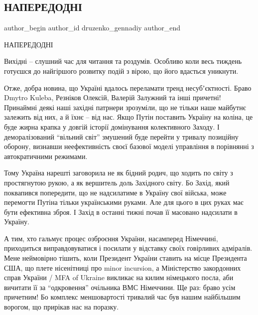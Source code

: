  
 
 
 
 
 
\subsection{НАПЕРЕДОДНІ}
\label{sec:23_01_2022.fb.druzenko_gennadiy.1.naperedodni}
 
\ifcmt
 author_begin
   author_id druzenko_gennadiy
 author_end
\fi

НАПЕРЕДОДНІ

Вихідні – слушний час для читання та роздумів. Особливо коли весь тиждень
готуєшся до найгіршого розвитку подій з вірою, що його вдасться уникнути.

Отже, добра новина, що Україні вдалось переламати тренд несубʼєктності. Браво
Dmytro Kuleba, Резніков Олексій, Валерій Залужний та інші причетні! Принаймні
деякі наші західні патрнери зрозуміли, що не тільки наше майбутнє залежить від
них, а й їхнє – від нас. Якщо Путін поставить Україну на коліна, це буде жирна
крапка у довгій історії домінування колективного Заходу. І деморалізований
\enquote{вільний світ} змушений буде перейти у тривалу позиційну оборону, визнавши
неефективність своєї базової моделі управління в порівнянні з автократичними
режимами.


Тому Україна нарешті заговорила не як бідний родич, що ходить по світу з
простягнутою рукою, а як вершитель доль Західного світу. Бо Захід, який
поквапився попередити, що не надсилатиме в Україну свої війська, може перемогти
Путіна тільки українськими руками. Але для цього в цих руках має бути ефективна
зброя. І Захід в останні тижні почав її масовано надсилати в Україну.

А тим, хто гальмує процес озброєння України, насамперед Німеччині, приходиться
виправдовуватися і посилати у відставку своїх говірливих адміралів. Мене
неймовірно тішить, коли Президент України ставить на місце Президента США, що
плете нісенітниці про minor incursion, а Міністерство закордонних справ України
/ MFA of Ukraine викликає на килим німецького посла, аби вичитати її за
\enquote{одкровення} очільника ВМС Німеччини. Ще раз: браво усім причетним! Бо комплекс
меншовартості тривалий час був нашим найбільшим ворогом, що прирікав нас на
поразку.


